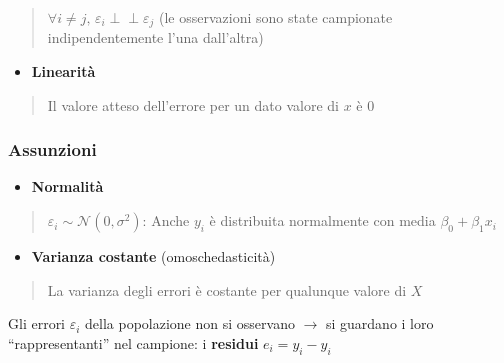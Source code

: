 \documentclass[
  a4paper,
  DIV=11,
  numbers=noendperiod]{scrreprt}
\providecommand{\tightlist}{%
  \setlength{\itemsep}{0pt}\setlength{\parskip}{0pt}}
\begin{document}
\vspace{1.5mm}

\begin{quote}
\(\forall i \neq j, \, \varepsilon_i \perp\!\!\!\perp \varepsilon_j\)
(le osservazioni sono state campionate indipendentemente l'una
dall'altra)
\end{quote}

\begin{itemize}
\tightlist
\item
  \textbf{Linearità}
\end{itemize}

\vspace{1.5mm}

\begin{quote}
Il valore atteso dell'errore per un dato valore di \(x\) è 0
\end{quote}

\subsubsection{Assunzioni}\label{assunzioni-1}

\begin{itemize}
\tightlist
\item
  \textbf{Normalità}
\end{itemize}

\vspace{1.5mm}

\begin{quote}
\(\varepsilon_i \sim \mathcal{N}(0, \sigma^2)\): Anche \(y_i\) è
distribuita normalmente con media \(\beta_0 + \beta_1x_i\)
\end{quote}

\begin{itemize}
\tightlist
\item
  \textbf{Varianza costante} (omoschedasticità)
\end{itemize}

\vspace{1.5mm}

\begin{quote}
La varianza degli errori è costante per qualunque valore di \(X\)
\end{quote}

\vspace{3mm}

Gli errori \(\varepsilon_i\) della popolazione non si osservano
\(\rightarrow\) si guardano i loro ``rappresentanti'' nel campione: i
\textbf{residui} \(e_i = y_i - \hat{y}_i\)
\end{document}
